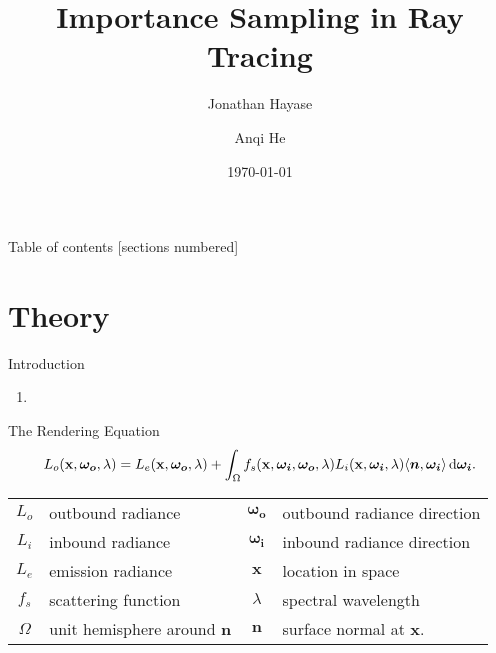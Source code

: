 \documentclass[10pt]{beamer}
\title{Importance Sampling in Ray Tracing}
\subtitle{}
\date{\today}
\author{Jonathan Hayase \and Anqi He}
\institute{Math 164 -- Scientific Computing -- FA18}
\DeclarePairedDelimiter\ip{\langle }{\rangle}
\begin{document}
\maketitle

\begin{frame}{Table of contents}
  [sections numbered]
  \tableofcontents[hideallsubsections]
\end{frame}

\section{Theory}

\begin{frame}{Introduction}
  \begin{enumerate}
	\item 
  \end{enumerate}
\end{frame}

\begin{frame}{The Rendering Equation}
  \[L_{o}(\mathbf x, \bm {\omega_{o}}, \lambda) = L_{e}(\mathbf x, \bm{\omega_o}, \lambda) + \int_\Omega f_s(\mathbf x, \bm{\omega_i}, \bm{\omega_o}, \lambda)L_i(\mathbf x, \bm{\omega_i}, \lambda)\ip{\bm n, \bm{\omega_i}} \dif \bm{\omega_i}.\]

  \hrulefill

  \begin{center}
    \begin{tabu}{clcl}
      \(L_{o}\)& outbound radiance & \(\bm{\omega_o}\)& outbound radiance direction\\
      \(L_{i}\)& inbound radiance & \(\bm{\omega_i}\) &inbound radiance direction\\
      \(L_{e}\)& emission radiance & \(\mathbf x\) &location in space\\
      \(f_s\) & scattering function & \(\lambda\)& spectral wavelength\\
      \(\Omega\) & unit hemisphere around \(\bm n\) & \(\bm n\)& surface normal at \(\mathbf x\).
    \end{tabu}
  \end{center}
\end{frame}
\end{document}
